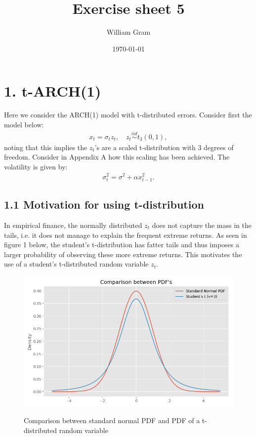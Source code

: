 \documentclass[11pt,a4paper,oneside]{article}
\title{Exercise sheet 5}
\author{William Gram}
\date{\today}
\newcommand{\lp}{\left(}
\newcommand{\rp}{\right)}
\newcommand{\iid}{\overset{iid}{\sim}}
\begin{document}
\maketitle

\rfoot{\thepage}

\section{1. t-ARCH(1)}
\renewcommand{\theequation}{1.\arabic{equation}}
\setcounter{equation}{0}

Here we consider the ARCH(1) model with t-distributed errors. Consider first the model below:
\begin{align}
    x_t = \sigma_t z_t, \quad z_t \iid t_3 \lp 0, 1\rp,
\end{align}
noting that this implies the $z_t$'s are a scaled t-distribution with 3 degrees of freedom. Consider in Appendix A how this scaling has been achieved. The volatility is given by:
\begin{align}
    \sigma_t^2 = \sigma^2 + \alpha x_{t-1}^2.
\end{align}

\subsection{1.1 Motivation for using t-distribution}
In empirical finance, the normally distributed $z_t$ does not capture the mass in the tails, i.e. it does not manage to explain the frequent extreme returns. As seen in figure 1 below, the student's t-distribution has fatter tails and thus imposes a larger probability of observing these more extreme returns. This motivates the use of a student's t-distributed random variable $z_t$.

\begin{figure}[ht]
\center
\caption{Comparison between standard normal PDF and PDF of a t-distributed random variable}
\includegraphics[scale=0.5]{images/normal_student_pdf.png}
\begingroup
{}
\endgroup
\end{figure}
\end{document}
